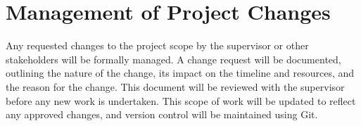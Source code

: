 \chapter{Management of Project Changes}

Any requested changes to the project scope by the supervisor or other stakeholders will be formally managed. A change request will be documented, outlining the nature of the change, its impact on the timeline and resources, and the reason for the change. This document will be reviewed with the supervisor before any new work is undertaken. This scope of work will be updated to reflect any approved changes, and version control will be maintained using Git.
